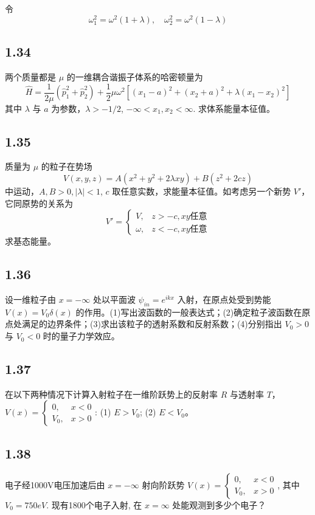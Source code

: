令
\begin{equation}
    \omega _{1}^{2}=\omega ^2\left( 1+\lambda \right) ,\quad \omega _{2}^{2}=\omega ^2\left( 1-\lambda \right) 
\end{equation}


\subsection{1.34}
两个质量都是 $\mu$ 的一维耦合谐振子体系的哈密顿量为
$$\hat{H} = \frac{1}{2\mu} (\hat{p}_1^2 + \hat{p}_2^2) + \frac{1}{2} \mu \omega^2 [(x_1 - a)^2 + (x_2 + a)^2 + \lambda (x_1 - x_2)^2]$$
其中 $\lambda$ 与 $a$ 为参数，$\lambda > -1/2$, $- \infty < x_1, x_2 < \infty$. 求体系能量本征值。

\subsection{1.35}
质量为 $\mu$ 的粒子在势场
$$V(x, y, z) = A(x^2+y^2+2\lambda xy)+B(z^2+2cz)$$
中运动，$A, B > 0, |\lambda| < 1$, $c$ 取任意实数，求能量本征值。如考虑另一个新势 $V'$，它同原势的关系为
$$V' = 
\begin{cases}
V, & z > -c, xy \text{任意}\\
\omega, & z < -c, xy \text{任意}
\end{cases}$$
求基态能量。

\subsection{1.36}
设一维粒子由 $x = -\infty$ 处以平面波 $\psi_{in} = e^{ikx}$ 入射，在原点处受到势能 $V(x) = V_0 \delta (x)$ 的作用。(1)写出波函数的一般表达式；(2)确定粒子波函数在原点处满足的边界条件；(3)求出该粒子的透射系数和反射系数；(4)分别指出 $V_0 > 0$ 与 $V_0 < 0$ 时的量子力学效应。

\subsection{1.37}
在以下两种情况下计算入射粒子在一维阶跃势上的反射率 $R$ 与透射率 $T$，$V(x) = \begin{cases} 
0, & x < 0 \\ 
V_0, & x > 0 
\end{cases}$: (1) $E > V_0$; (2) $E < V_0$。

\subsection{1.38}
电子经1000V电压加速后由 $x = -\infty$ 射向阶跃势 $V(x) = \begin{cases}
0, & x < 0 \\
V_0, & x > 0 
\end{cases}$, 其中 $V_0 = 750eV$. 现有1800个电子入射, 在 $x = \infty$ 处能观测到多少个电子？

